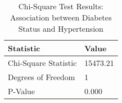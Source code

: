 
\begin{table}[h!]
\centering
\begin{tabular}{|l|l|}
\hline
\textbf{Statistic}       & \textbf{Value} \\ \hline
Chi-Square Statistic        & 15473.21       \\ \hline
Degrees of Freedom          & 1          \\ \hline
P-Value                     & 0.000         \\ \hline
\end{tabular}

\vspace{0.5cm} %

\caption{Chi-Square Test Results: Association between Diabetes Status and Hypertension}
\label{tab:chi_square_results}
\end{table}
